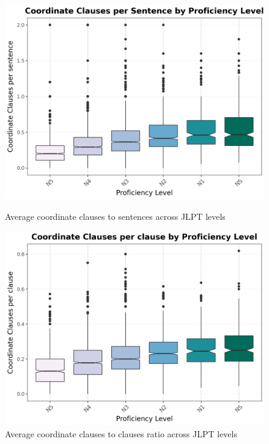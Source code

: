 \begin{figure}[htbp]
    \centering
    \begin{minipage}{.48\textwidth}
        \centering
    \includegraphics[scale=.3]{img/CCperSent}
    \caption[Average coordinate clauses to sentences across JLPT levels]{Average coordinate clauses to sentences across JLPT levels}
        \label{fig:CCperSent}
    \end{minipage}
    \hfill
\begin{minipage}{.48\textwidth}
        \centering
        \includegraphics[scale=.3]{img/CCperC}
        \caption[Average coordinate clauses to clauses ratio across JLPT levels]{Average coordinate clauses to clauses ratio across JLPT levels}
\label{fig:CCperCl}
\end{minipage}
    \end{figure}

